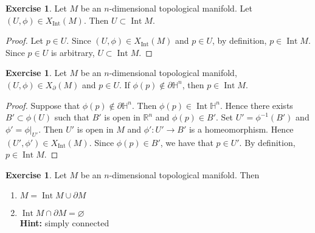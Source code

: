 \documentclass{book}
\theoremstyle{definition}
\newtheorem{ex}[definition]{Exercise}
\renewcommand{\H}{\mathbb{H}}
\newcommand{\R}{\mathbb{R}}
\DeclareMathOperator{\Int}{Int}
\DeclareMathOperator*{\0}{\mbf{0}}
\DeclareMathOperator*{\1}{\mbf{1}}
\newcommand{\tbf}[1]{\textbf{#1}}
\newcommand{\p}{\partial}
\begin{document}
		\begin{ex}
		Let $M$ be an $n$-dimensional topological manifold. Let $(U, \phi) \in X_{\Int}(M)$. Then $U \subset \Int M$.
	\end{ex}
	
	\begin{proof}
		Let $p \in U$. Since $(U, \phi) \in X_{\Int}(M)$ and $p \in U$, by definition, $p \in \Int M$. Since $p \in U$ is arbitrary, $U \subset \Int M$.
	\end{proof}

	\begin{ex}
		Let $M$ be an $n$-dimensional topological manifold, $(U, \phi) \in X_{\p}(M)$ and $p \in U$. If $\phi(p) \not \in \p \H^n$, then $p \in \Int M$.
	\end{ex}

	\begin{proof}
		Suppose that $\phi(p) \not \in \p \H^n$.  Then  $\phi(p) \in \Int \H^n$. Hence there exists $B' \subset \phi(U)$ such that $B'$ is open in $\R^n$ and $\phi(p) \in B'$. Set $U' = \phi^{-1}(B')$ and $\phi' = \phi|_{U'}$. Then $U'$ is open in $M$ and $\phi': U' \rightarrow B'$ is a homeomorphism. Hence $(U', \phi') \in X_{\Int}(M)$. Since $\phi(p) \in B'$, we have that $p \in U'$. By definition, $p \in \Int M$.
	\end{proof}

	\begin{ex}
		Let $M$ be an $n$-dimensional topological manifold. Then 
		\begin{enumerate}
			\item $M = \Int M \cup \p M $
			\item $\Int M \cap \p M = \varnothing$ \\
			\tbf{Hint:} simply connected
		\end{enumerate}
	\end{ex}
\end{document}
